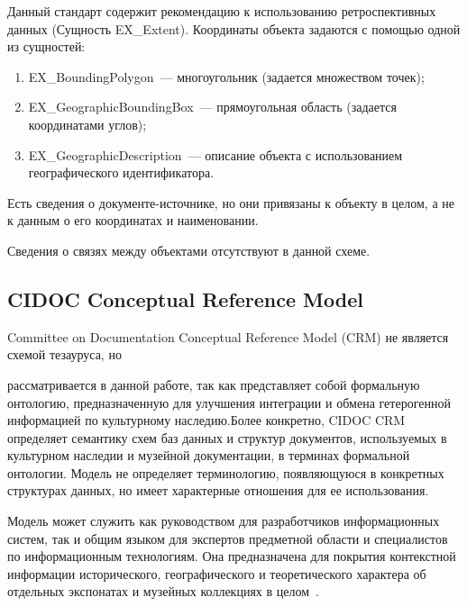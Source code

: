 \begin{multicols}{2}
  Данный стандарт содержит рекомендацию к использованию ретроспективных данных 
(Сущность {EX\_Extent}). Координаты объекта задаются с по\-мощью одной из 
сущностей:
  \begin{enumerate}[(1)]
\item {EX\_BoundingPolygon}~--- многоугольник (задается множеством точек);\\[-14pt]
\item {EX\_GeographicBoundingBox}~--- прямоугольная область (задается координатами 
углов);\\[-14pt]
\item {EX\_GeographicDescription}~--- описание объекта с использованием 
географического идентификатора.
\end{enumerate}
  
  Есть сведения о документе-источнике, но они привязаны к объекту в целом, а не к данным 
о его координатах и наименовании.
  
  Сведения о связях между объектами отсутствуют в данной схеме.
  
     \vspace*{-6pt}

  \subsection{CIDOC Conceptual Reference Model}
  
{Committee on Documentation Conceptual Reference Model} (CRM) не является схемой 
тезауруса, но\linebreak\vspace*{-12pt}

\pagebreak

\noindent
 рассматривается в данной работе, так как пред\-став\-ля\-ет собой формальную 
онтологию, предназначенную для улучшения интеграции и обмена гетеро\-генной 
информацией по культурному наследию.\linebreak Более конкретно, CIDOC CRM определяет 
семантику схем баз данных и структур документов, используемых в культурном наследии и 
музейной документации, в терминах формальной онтологии. Модель не определяет 
терминологию, появляющуюся в конкретных структурах данных, но имеет характерные 
отношения для ее использования.
  
  Модель может служить как руководством для разработчиков информационных систем, 
так и общим языком для экспертов предметной области и специалистов по информационным 
технологиям. Она предназначена для покрытия контекстной информации исторического, 
географического и теоретического характера об отдельных экспонатах и музейных 
коллекциях в целом~\cite{6-sk}.
  

\end{multicols}
